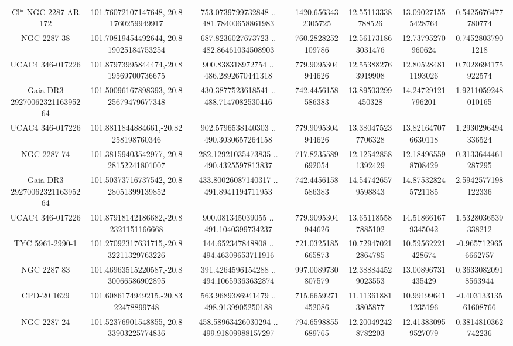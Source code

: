 \begin{table}
\begin{tabular}{ccccccc}
Cl* NGC 2287     AR     172 & 101.76072107147648,-20.81760259949917 & 753.0739799732848 .. 481.78400658861983 & 1420.6563432305725 & 12.55113338788526 & 13.090271555428764 & 0.5425676477780774 \\
NGC  2287    38 & 101.70819454492644,-20.819025184753254 & 687.8236027673723 .. 482.86461034508903 & 760.2828252109786 & 12.561731863031476 & 12.73795270960624 & 0.74528037901218 \\
UCAC4 346-017226 & 101.87973995844474,-20.819569700736675 & 900.838318972754 .. 486.2892670441318 & 779.9095304944626 & 12.553882763919908 & 12.805284811193026 & 0.7028694175922574 \\
Gaia DR3 2927006232116395264 & 101.50096167898393,-20.825679479677348 & 430.3877523618541 .. 488.7147082530446 & 742.4456158586383 & 13.89503299450328 & 14.24729121796201 & 1.9211059248010165 \\
UCAC4 346-017226 & 101.8811844884661,-20.82258198760346 & 902.5796538140303 .. 490.3030657264158 & 779.9095304944626 & 13.380475237706328 & 13.821647076630118 & 1.2930296494336524 \\
NGC  2287    74 & 101.38159403542977,-20.828152241801007 & 282.12921035473835 .. 490.4325597813837 & 717.8235589692054 & 12.125428581392429 & 12.184965598708429 & 0.3133644461287295 \\
Gaia DR3 2927006232116395264 & 101.50373716737542,-20.828051399139852 & 433.80026087140317 .. 491.8941194711953 & 742.4456158586383 & 14.547426579598843 & 14.875328245721185 & 2.5942577198122336 \\
UCAC4 346-017226 & 101.87918142186682,-20.82321151166668 & 900.081345039055 .. 491.1040399734237 & 779.9095304944626 & 13.651185587885102 & 14.518661679345042 & 1.5328036539338212 \\
TYC 5961-2990-1 & 101.27092317631715,-20.832211329763226 & 144.652347848808 .. 494.46309653711916 & 721.0325185665873 & 10.729470212864785 & 10.59562221428674 & -0.9657129656662757 \\
NGC  2287    83 & 101.46963515220587,-20.830066586902895 & 391.4264596154288 .. 494.10659363632874 & 997.0089730807579 & 12.388844529023553 & 13.00896731435429 & 0.36330820918563944 \\
CPD-20  1629 & 101.6086174949215,-20.8322478899748 & 563.9689386941479 .. 498.9139905250188 & 715.6659271452086 & 11.113618813805877 & 10.991996411235196 & -0.40313313561608766 \\
NGC  2287    24 & 101.52376901548855,-20.833903225774836 & 458.58963426030294 .. 499.91809988157297 & 794.6598855689765 & 12.200492428782203 & 12.413830959527079 & 0.3814810362742236 \\

\end{tabular}
\end{table}

